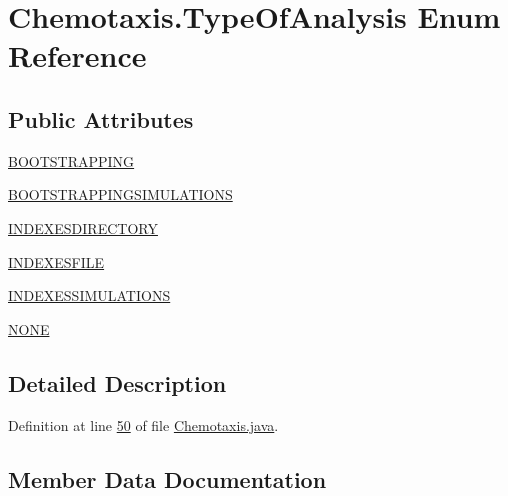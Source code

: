\hypertarget{enumanalysis_1_1_chemotaxis_1_1_type_of_analysis}{}\section{Chemotaxis.\+Type\+Of\+Analysis Enum Reference}
\label{enumanalysis_1_1_chemotaxis_1_1_type_of_analysis}
\subsection*{Public Attributes}
\begin{DoxyCompactItemize}
\item 
\hyperlink{enumanalysis_1_1_chemotaxis_1_1_type_of_analysis_ad9b1fe1a91148ef56f2b25bb3578764f}{B\+O\+O\+T\+S\+T\+R\+A\+P\+P\+I\+NG}
\item 
\hyperlink{enumanalysis_1_1_chemotaxis_1_1_type_of_analysis_a7520eb9cb2be4df8fff8c63292caed13}{B\+O\+O\+T\+S\+T\+R\+A\+P\+P\+I\+N\+G\+S\+I\+M\+U\+L\+A\+T\+I\+O\+NS}
\item 
\hyperlink{enumanalysis_1_1_chemotaxis_1_1_type_of_analysis_aea93300e25d2c79a263d702652974555}{I\+N\+D\+E\+X\+E\+S\+D\+I\+R\+E\+C\+T\+O\+RY}
\item 
\hyperlink{enumanalysis_1_1_chemotaxis_1_1_type_of_analysis_a2d2e1e42ff8abcd21e8ddb4d502d9ec3}{I\+N\+D\+E\+X\+E\+S\+F\+I\+LE}
\item 
\hyperlink{enumanalysis_1_1_chemotaxis_1_1_type_of_analysis_a8c82f8309b37b928874804133c555393}{I\+N\+D\+E\+X\+E\+S\+S\+I\+M\+U\+L\+A\+T\+I\+O\+NS}
\item 
\hyperlink{enumanalysis_1_1_chemotaxis_1_1_type_of_analysis_a899caa602e4fff675b17cdbab33607ec}{N\+O\+NE}
\end{DoxyCompactItemize}


\subsection{Detailed Description}


Definition at line \hyperlink{_chemotaxis_8java_source_l00050}{50} of file \hyperlink{_chemotaxis_8java_source}{Chemotaxis.\+java}.



\subsection{Member Data Documentation}
\hypertarget{enumanalysis_1_1_chemotaxis_1_1_type_of_analysis_ad9b1fe1a91148ef56f2b25bb3578764f}{}\label{enumanalysis_1_1_chemotaxis_1_1_type_of_analysis_ad9b1fe1a91148ef56f2b25bb3578764f} 
